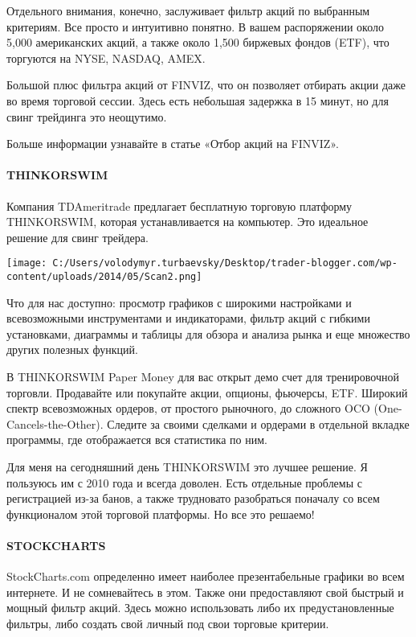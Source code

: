 \documentclass[a5paper]{article}
\begin{document}
Отдельного внимания, конечно, заслуживает фильтр акций по выбранным критериям. Все просто и интуитивно понятно. В вашем распоряжении около 5,000 американских акций, а также около 1,500 биржевых фондов (ETF), что торгуются на NYSE, NASDAQ, AMEX.

Большой плюс фильтра акций от FINVIZ, что он позволяет отбирать акции даже во время торговой сессии. Здесь есть небольшая задержка в 15 минут, но для свинг трейдинга это неощутимо.

Больше информации узнавайте в статье «Отбор акций на FINVIZ».

\paragraph{THINKORSWIM}

Компания TDAmeritrade предлагает бесплатную торговую платформу
THINKORSWIM, которая устанавливается на компьютер. Это идеальное
решение для свинг трейдера.

\texttt{[image: C:/Users/volodymyr.turbaevsky/Desktop/trader-blogger.com/wp-content/uploads/2014/05/Scan2.png]}

Что для нас доступно: просмотр графиков с широкими настройками и всевозможными инструментами и индикаторами, фильтр акций с гибкими установками, диаграммы и таблицы для обзора и анализа рынка и еще множество других полезных функций.

В THINKORSWIM Paper Money для вас открыт демо счет для тренировочной торговли. Продавайте или покупайте акции, опционы, фьючерсы, ETF. Широкий спектр всевозможных ордеров, от простого рыночного, до сложного OCO (One-Cancels-the-Other). Следите за своими сделками и ордерами в отдельной вкладке программы, где отображается вся статистика по ним.

Для меня на сегодняшний день THINKORSWIM это лучшее решение. Я
пользуюсь им с 2010 года и всегда доволен. Есть отдельные проблемы с
регистрацией из-за банов, а также трудновато разобраться поначалу со
всем функционалом этой торговой платформы. Но все это решаемо!

\paragraph{STOCKCHARTS}

StockCharts.com определенно имеет наиболее презентабельные графики во
всем интернете. И не сомневайтесь в этом. Также они предоставляют свой
быстрый и мощный фильтр акций. Здесь можно использовать либо их
предустановленные фильтры, либо создать свой личный под свои торговые
критерии.
\end{document}
